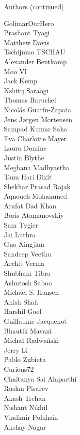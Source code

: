 \begin{frame}{Authors (continued)}
\begin{multicols}{5}
\tiny
GolimarOurHero\\
Prashant Tyagi\\
Matthew Davis\\
Tschijnmo TSCHAU\\
Alexander Bentkamp\\
Moo VI\\
Jack Kemp\\
Kshitij Saraogi\\
Thomas Baruchel\\
Nicolás Guarín-Zapata\\
Jens Jørgen Mortensen\\
Sampad Kumar Saha\\
Eva Charlotte Mayer\\
Laura Domine\\
Justin Blythe\\
Meghana Madhyastha\\
Tanu Hari Dixit\\
Shekhar Prasad Rajak\\
Aqnouch Mohammed\\
Arafat Dad Khan\\
Boris Atamanovskiy\\
Sam Tygier\\
Jai Luthra\\
Guo Xingjian\\
Sandeep Veethu\\
Archit Verma\\
Shubham Tibra\\
Ashutosh Saboo\\
Michael S. Hansen\\
Anish Shah\\
Harshil Goel\\
Guillaume Jacquenot\\
Bhautik Mavani\\
Michał Radwański\\
Jerry Li\\
Pablo Zubieta\\
Curious72\\
Chaitanya Sai Alaparthi\\
Ruslan Pisarev\\
Akash Trehan\\
Nishant Nikhil\\
Vladimir Poluhsin\\
Akshay Nagar\\

\end{multicols}
\end{frame}
